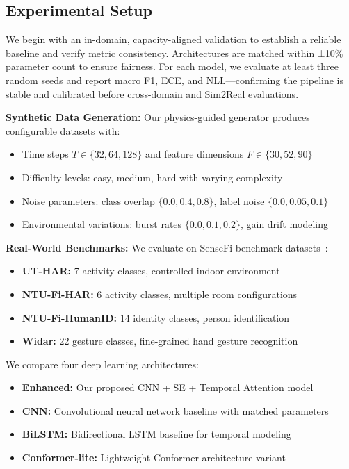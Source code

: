\documentclass[journal]{IEEEtran}
\begin{document}
\subsection{Experimental Setup}

We begin with an in-domain, capacity-aligned validation to establish a reliable baseline and verify metric consistency. Architectures are matched within ±10\% parameter count to ensure fairness. For each model, we evaluate at least three random seeds and report macro F1, ECE, and NLL—confirming the pipeline is stable and calibrated before cross-domain and Sim2Real evaluations.


\textbf{Synthetic Data Generation:} Our physics-guided generator produces configurable datasets with:
\begin{itemize}
\item Time steps $T \in \{32, 64, 128\}$ and feature dimensions $F \in \{30, 52, 90\}$
\item Difficulty levels: easy, medium, hard with varying complexity
\item Noise parameters: class overlap $\{0.0, 0.4, 0.8\}$, label noise $\{0.0, 0.05, 0.1\}$
\item Environmental variations: burst rates $\{0.0, 0.1, 0.2\}$, gain drift modeling
\end{itemize}

\textbf{Real-World Benchmarks:} We evaluate on SenseFi benchmark datasets~\cite{yang2023sensefi}:
\begin{itemize}
\item \textbf{UT-HAR:} 7 activity classes, controlled indoor environment
\item \textbf{NTU-Fi-HAR:} 6 activity classes, multiple room configurations
\item \textbf{NTU-Fi-HumanID:} 14 identity classes, person identification
\item \textbf{Widar:} 22 gesture classes, fine-grained hand gesture recognition
\end{itemize}


We compare four deep learning architectures:
\begin{itemize}
\item \textbf{Enhanced:} Our proposed CNN + SE + Temporal Attention model
\item \textbf{CNN:} Convolutional neural network baseline with matched parameters
\item \textbf{BiLSTM:} Bidirectional LSTM baseline for temporal modeling
\item \textbf{Conformer-lite:} Lightweight Conformer architecture variant
\end{itemize}
\end{document}
